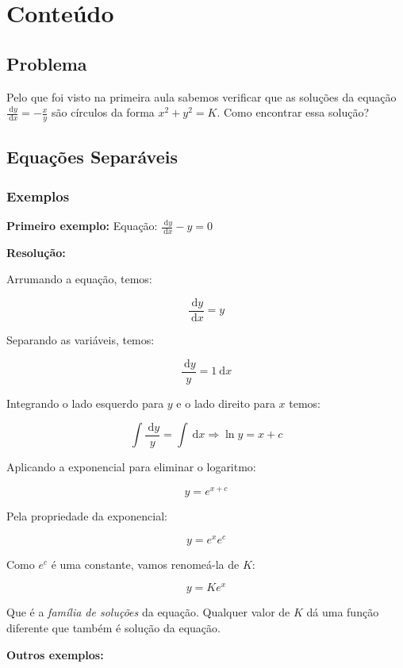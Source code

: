\documentclass[a4paper]{article}
\newcommand{\ud}{\mathrm{\ d}}
\begin{document}
\section{Conteúdo}

\subsection{Problema}

Pelo que foi visto na primeira aula sabemos verificar que as soluções
da equação $\frac{\ud y}{\ud x} = -\frac{x}{y}$ são círculos da forma
$x^2 + y^2 = K$. Como encontrar essa solução?

\subsection{Equações Separáveis}

\subsubsection{Exemplos}

{\bf Primeiro exemplo:}
Equação: $\frac{\ud y}{\ud x} - y = 0$

{\bf Resolução:}
\begin{multicols}{2}
Arrumando a equação, temos:

$$\frac{\ud y}{\ud x} = y$$

Separando as variáveis, temos:

$$\frac{\ud y}{y} = 1 \ud x$$

Integrando o lado esquerdo para $y$ e o lado direito para $x$ temos:

$$\int \frac{\ud y}{y} = \int \ud x \Rightarrow \ln y = x+c$$

Aplicando a exponencial para eliminar o logaritmo:

$$y = e^{x+c}$$

Pela propriedade da exponencial:

$$y = e^xe^c$$

Como $e^c$ é uma constante, vamos renomeá-la de $K$:

$$y=Ke^x$$

Que é a {\em família de soluções} da equação. Qualquer valor de $K$ dá
uma função diferente que também é solução da equação.
\end{multicols}

{\bf Outros exemplos:}
\end{document}
